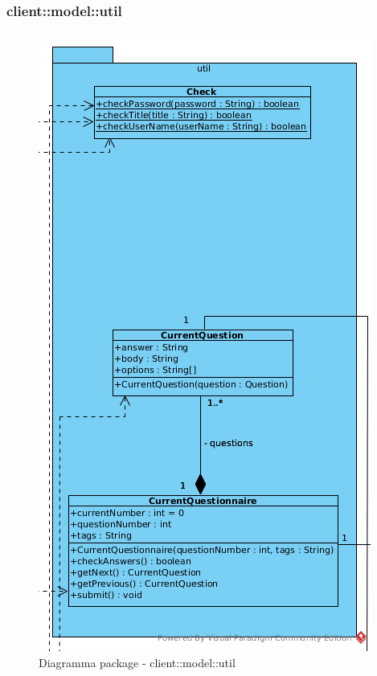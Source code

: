\subsubsection{client::model::util}
\begin{center}
		\begin{figure}[H]
			\centering \includegraphics[scale=4, max width=\textwidth, max height=\myheight]{../img/diagrammiClassi/client/model/util.png}
			\caption{Diagramma package - client::model::util}
		\end{figure}
	\end{center}\hypertarget{client::model::util::Check}{}
